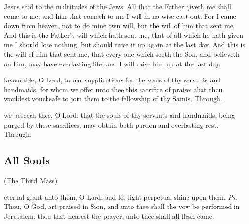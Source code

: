  Jesus said to the multitudes of the Jews: All that the Father giveth me shall come to me; and him that cometh to me I will in no wise cast out. For I came down from heaven, not to do mine own will, but the will of him that sent me. And this is the Father's will which hath sent me, that of all which he hath given me I should lose nothing, but should raise it up again at the last day. And this is the will of him that sent me, that every one which seeth the Son, and believeth on him, may have everlasting life: and I will raise him up at the last day.


\secret
{} favourable, O Lord, to our supplications for the souls of thy servants and handmaids, for whom we offer unto thee this sacrifice of praise: that thou wouldest vouchsafe to join them to the fellowship of thy Saints. Through.

\clearpage
{}

\postcommunion
{} we beseech thee, O Lord: that the souls of thy servants and handmaids, being purged by these sacrifices, may obtain both pardon and everlasting rest. Through.


\subsection{All Souls}
\centerline{\small{(The Third Mass)}}\label{AllSoulsIII}

\introit
{} eternal grant unto them, O Lord: and let light perpetual shine upon them. \textit{Ps.} Thou, O God, art praised in Sion, and unto thee shall the vow be performed in Jerusalem: thou that hearest the prayer, unto thee shall all flesh come.

